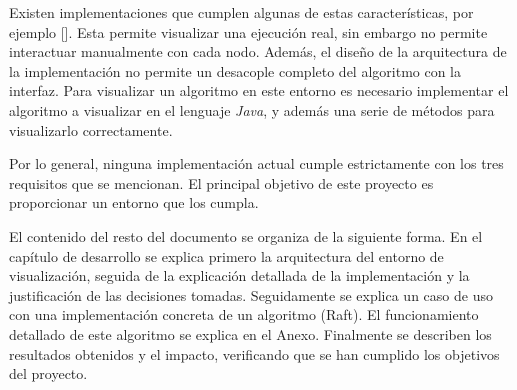 Existen implementaciones que cumplen algunas de estas características, por ejemplo []. Esta permite visualizar una ejecución real, sin embargo no permite interactuar manualmente con cada nodo. Además, el diseño de la arquitectura de la implementación no permite un desacople completo del algoritmo con la interfaz. Para visualizar un algoritmo en este entorno es necesario implementar el algoritmo a visualizar en el lenguaje \textit{Java}, y además una serie de métodos para visualizarlo correctamente.

Por lo general, ninguna implementación actual cumple estrictamente con los tres requisitos que se mencionan. El principal objetivo de este proyecto es proporcionar un entorno que los cumpla.

El contenido del resto del documento se organiza de la siguiente forma. En el capítulo de desarrollo se explica primero la arquitectura del entorno de visualización, seguida de la explicación detallada de la implementación y la justificación de las decisiones tomadas. Seguidamente se explica un caso de uso con una implementación concreta de un algoritmo (Raft). El funcionamiento detallado de este algoritmo se explica en el Anexo. Finalmente se describen los resultados obtenidos y el impacto, verificando que se han cumplido los objetivos del proyecto.



